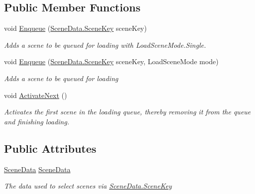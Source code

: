 \subsection*{Public Member Functions}
\begin{DoxyCompactItemize}
\item 
void \hyperlink{class_skyrates_1_1_client_1_1_scene_1_1_scene_loader_af80eb4ba6f0dd10364de00ae90886e2f}{Enqueue} (\hyperlink{class_skyrates_1_1_client_1_1_scene_1_1_scene_data_a31ee71a248fd3456a7e655f71f268583}{Scene\-Data.\-Scene\-Key} scene\-Key)
\begin{DoxyCompactList}\small\item\em Adds a scene to be queued for loading with Load\-Scene\-Mode.\-Single. \end{DoxyCompactList}\item 
void \hyperlink{class_skyrates_1_1_client_1_1_scene_1_1_scene_loader_a488b8b87e7bde0b749b3bef7250298e8}{Enqueue} (\hyperlink{class_skyrates_1_1_client_1_1_scene_1_1_scene_data_a31ee71a248fd3456a7e655f71f268583}{Scene\-Data.\-Scene\-Key} scene\-Key, Load\-Scene\-Mode mode)
\begin{DoxyCompactList}\small\item\em Adds a scene to be queued for loading \end{DoxyCompactList}\item 
void \hyperlink{class_skyrates_1_1_client_1_1_scene_1_1_scene_loader_a5805907cc29887b3186efc9802bcafbe}{Activate\-Next} ()
\begin{DoxyCompactList}\small\item\em Activates the first scene in the loading queue, thereby removing it from the queue and finishing loading. \end{DoxyCompactList}\end{DoxyCompactItemize}
\subsection*{Public Attributes}
\begin{DoxyCompactItemize}
\item 
\hyperlink{class_skyrates_1_1_client_1_1_scene_1_1_scene_data}{Scene\-Data} \hyperlink{class_skyrates_1_1_client_1_1_scene_1_1_scene_loader_a1df3740a539b25e862afdc4eebf4a9b5}{Scene\-Data}
\begin{DoxyCompactList}\small\item\em The data used to select scenes via \hyperlink{class_skyrates_1_1_client_1_1_scene_1_1_scene_data_a31ee71a248fd3456a7e655f71f268583}{Scene\-Data.\-Scene\-Key} \end{DoxyCompactList}\end{DoxyCompactItemize}
